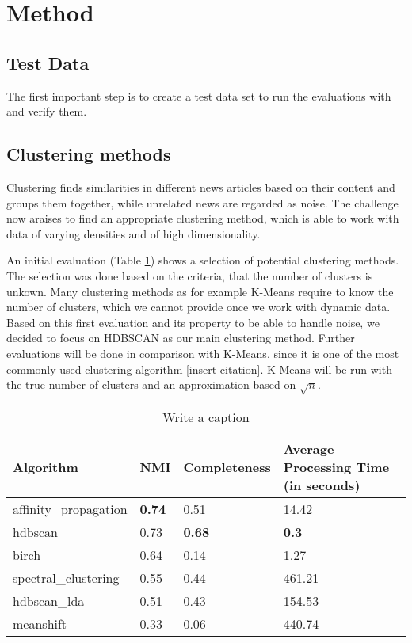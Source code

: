 \section{Method}



\subsection{Test Data}

The first important step is to create a test data set to run the evaluations with and verify them.


\subsection{Clustering methods}

Clustering finds similarities in different news articles based on their content and groups them together, while unrelated news are regarded as noise. The challenge now araises to find an appropriate clustering method, which is able to work with data of varying densities and of high dimensionality.

An initial evaluation (Table \ref{tab:first_evaluation}) shows a selection of potential clustering methods. The selection was done based on the criteria, that the number of clusters is unkown. Many clustering methods as for example K-Means require to know the number of clusters, which we cannot provide once we work with dynamic data. Based on this first evaluation and its property to be able to handle noise, we decided to focus on HDBSCAN as our main clustering method. Further evaluations will be done in comparison with K-Means, since it is one of the most commonly used clustering algorithm [insert citation]. K-Means will be run with the true number of clusters and an approximation based on $\sqrt{n}$.

\begin{table}[h]
    \centering
    \label{tab:first_evaluation}
    \begin{tabular}{|l|l|l|l|}
    \hline
    \textbf{Algorithm} & \textbf{NMI} & \textbf{Completeness}  & \textbf{Average Processing Time (in seconds)} \\ \hline
    affinity\_propagation & \textbf{0.74} & 0.51 & 14.42 \\ \hline
    hdbscan & 0.73 & \textbf{0.68} & \textbf{0.3} \\ \hline
    birch & 0.64 & 0.14 & 1.27 \\ \hline
    spectral\_clustering & 0.55 & 0.44  & 461.21 \\ \hline
    hdbscan\_lda & 0.51 & 0.43 & 154.53 \\ \hline
    meanshift & 0.33 & 0.06  & 440.74 \\ \hline
    \end{tabular}
    \caption{Write a caption}
\end{table}

